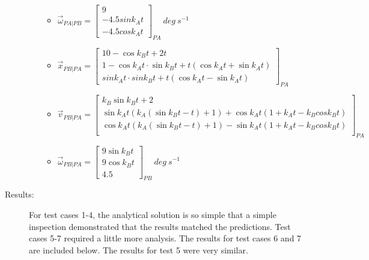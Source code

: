 \begin{description}
\begin{enumerate}
\begin{itemize}
    \item $\vec \omega_{PA|PB} = \begin{bmatrix} 9\\
                                               -4.5 sin k_A t\\
                                               -4.5 cos k_A t
                               \end{bmatrix}_{PA}\ deg\ s^{-1}$
    
    \item $\vec x_{PB|PA} = \begin{bmatrix} 10 - \cos k_B t + 2t\\
                                          1 - \cos k_A t \cdot \sin k_B t + t (\cos k_A t + \sin k_A t)\\
                                          sin k_A t \cdot sin k_B t + t (\cos k_A t - \sin k_A t)
                          \end{bmatrix}_{PA}$

    \item $\vec v_{PB|PA} = \begin{bmatrix} 
              k_B \sin k_B t +2 \\
              \sin k_A t (k_A (\sin k_B t - t) +1) + \cos k_A t (1 + k_A t - k_B cos k_B t)\\
              \cos k_A t (k_A (\sin k_B t - t) +1) - \sin k_A t (1 + k_A t - k_B cos k_B t)\\ 
           \end{bmatrix}_{PA}$
           
    \item $\vec \omega_{PB|PA} = \begin{bmatrix} 9 \sin k_B t\\
                                               9 \cos k_B t\\
                                               4.5 
                               \end{bmatrix}_{PB}\ deg\ s^{-1}$
   \end{itemize}
\end{enumerate}

\item[Results:]
For test cases 1-4, the analytical solution is so simple that a simple inspection demonstrated that the results matched the predictions.  Test cases 5-7 required a little more analysis.  The results for test cases 6 and 7 are included below.  The results for test 5 were very similar.
 

\end{description}
